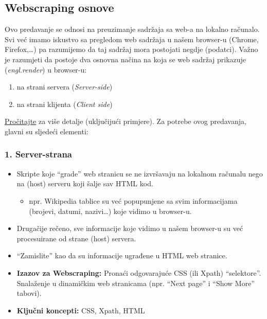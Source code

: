 \documentclass[
]{article}
\providecommand{\tightlist}{%
  \setlength{\itemsep}{0pt}\setlength{\parskip}{0pt}}
\begin{document}
\hypertarget{webscraping-osnove}{%
\subsection{Webscraping osnove}\label{webscraping-osnove}}

Ovo predavanje se odnosi na preuzimanje sadržaja sa web-a na lokalno
računalo. Svi već imamo iskustvo sa pregledom web sadržaja u našem
browser-u (Chrome, Firefox,\ldots) pa razumijemo da taj sadržaj mora
postojati negdje (podatci). Važno je razumjeti da postoje dva osnovna
načina na koja se web sadržaj prikazuje (\emph{engl.render}) u
browser-u:

\begin{enumerate}
\def\labelenumi{\arabic{enumi}.}
\tightlist
\item
  na strani servera (\emph{Server-side})
\item
  na strani klijenta (\emph{Client side})
\end{enumerate}

\href{https://www.codeconquest.com/website/client-side-vs-server-side/}{Pročitajte}
za više detalje (uključijući primjere). Za potrebe ovog predavanja,
glavni su sljedeći elementi:

\hypertarget{server-strana}{%
\subsubsection{1. Server-strana}\label{server-strana}}

\begin{itemize}
\tightlist
\item
  Skripte koje ``grade'' web stranicu se ne izvršavaju na lokalnom
  računalu nego na (host) serveru koji šalje sav HTML kod.

  \begin{itemize}
  \tightlist
  \item
    npr. Wikipedia tablice su već popupunjene sa svim informacijama
    (brojevi, datumi, nazivi\ldots) koje vidimo u browser-u.
  \end{itemize}
\item
  Drugačije rečeno, sve informacije koje vidimo u našem browser-u su već
  procesuirane od strane (host) servera.
\item
  ``Zamislite'' kao da su informacije ugrađene u HTML web stranice.
\item
  \textbf{Izazov za Webscraping:} Pronaći odgovarajuće CSS (ili Xpath)
  ``selektore''. Snalaženje u dinamičkim web stranicama (npr. ``Next
  page'' i ``Show More'' tabovi).
\item
  \textbf{Ključni koncepti:} CSS, Xpath, HTML
\end{itemize}
\end{document}
